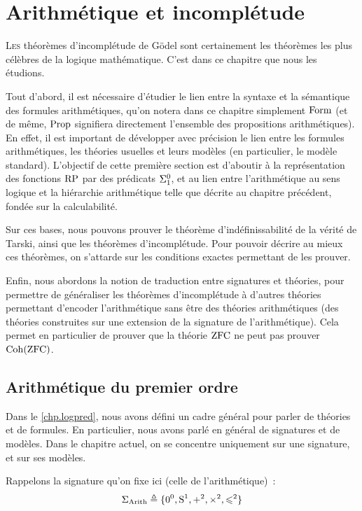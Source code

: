 \chapter{Arithmétique et incomplétude}
\label{chp.arith}

\minitoc

\lettrine{L}{es} théorèmes d'incomplétude de Gödel sont certainement les
théorèmes les plus célèbres de la logique mathématique. C'est dans ce chapitre
que nous les étudions.

Tout d'abord, il est nécessaire d'étudier le lien entre la syntaxe et la
sémantique des formules arithmétiques, qu'on notera dans ce chapitre simplement
$\operatorname{Form}$ (et de même, $\operatorname{Prop}$ signifiera directement l'ensemble des
propositions arithmétiques). En effet, il est important de développer avec
précision le lien entre les formules arithmétiques, les théories usuelles et
leurs modèles (en particulier, le modèle standard). L'objectif de cette première
section est d'aboutir à la représentation des fonctions $\operatorname{RP}$ par des
prédicats $\Sigma^0_{1}$, et au lien entre l'arithmétique au sens logique et la
hiérarchie arithmétique telle que décrite au chapitre précédent, fondée sur la
calculabilité.

Sur ces bases, nous pouvons prouver le théorème d'indéfinissabilité de la vérité
de Tarski, ainsi que les théorèmes d'incomplétude. Pour pouvoir décrire au mieux
ces théorèmes, on s'attarde sur les conditions exactes permettant de les
prouver.

Enfin, nous abordons la notion de traduction entre signatures et théories, pour
permettre de généraliser les théorèmes d'incomplétude à d'autres théories
permettant d'encoder l'arithmétique sans être des théories arithmétiques (des
théories construites sur une extension de la signature de l'arithmétique). Cela
permet en particulier de prouver que la théorie $\operatorname{ZFC}$ ne peut pas prouver
$\operatorname{Coh}(\operatorname{ZFC})$.

\section{Arithmétique du premier ordre}

Dans le \cref{chp.logpred}, nous avons défini un cadre général pour parler de
théories et de formules. En particulier, nous avons parlé en général de
signatures et de modèles. Dans le chapitre actuel, on se concentre uniquement
sur une signature, et sur ses modèles.

Rappelons la signature qu'on fixe ici (celle de l'arithmétique)~:
\[\Sigma_{\operatorname{Arith}} \triangleq \{0^0,\operatorname{S}^1,+^2,\times^2,\leqslant^2\}\]


